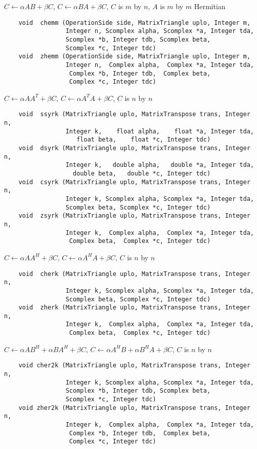 \normalsize
$C \leftarrow \alpha AB + \beta C$, $C \leftarrow \alpha BA + \beta C$,
$C$ is $m$ by $n$, $A$ is $m$ by $m$ Hermitian
\footnotesize
\begin{verbatim}
    void  chemm (OperationSide side, MatrixTriangle uplo, Integer m,
                 Integer n, Scomplex alpha, Scomplex *a, Integer tda,
                 Scomplex *b, Integer tdb, Scomplex beta,
                 Scomplex *c, Integer tdc)
    void  zhemm (OperationSide side, MatrixTriangle uplo, Integer m,
                 Integer n,  Complex alpha,  Complex *a, Integer tda,
                  Complex *b, Integer tdb,  Complex beta,
                  Complex *c, Integer tdc)
\end{verbatim}
\normalsize
$C \leftarrow \alpha A A^T + \beta C$,
$C \leftarrow \alpha A^T A + \beta C$,
$C$ is $n$ by $n$
\footnotesize
\begin{verbatim}
    void  ssyrk (MatrixTriangle uplo, MatrixTranspose trans, Integer n,
                 Integer k,    float alpha,    float *a, Integer tda,
                    float beta,    float *c, Integer tdc)
    void  dsyrk (MatrixTriangle uplo, MatrixTranspose trans, Integer n,
                 Integer k,   double alpha,   double *a, Integer tda,
                   double beta,   double *c, Integer tdc)
    void  csyrk (MatrixTriangle uplo, MatrixTranspose trans, Integer n,
                 Integer k, Scomplex alpha, Scomplex *a, Integer tda,
                 Scomplex beta, Scomplex *c, Integer tdc)
    void  zsyrk (MatrixTriangle uplo, MatrixTranspose trans, Integer n,
                 Integer k,  Complex alpha,  Complex *a, Integer tda,
                  Complex beta,  Complex *c, Integer tdc)
\end{verbatim}
\normalsize
$C \leftarrow \alpha A A^H + \beta C$,
$C \leftarrow \alpha A^H A + \beta C$,
$C$ is $n$ by $n$
\footnotesize
\begin{verbatim}
    void  cherk (MatrixTriangle uplo, MatrixTranspose trans, Integer n,
                 Integer k, Scomplex alpha, Scomplex *a, Integer tda,
                 Scomplex beta, Scomplex *c, Integer tdc)
    void  zherk (MatrixTriangle uplo, MatrixTranspose trans, Integer n,
                 Integer k,  Complex alpha,  Complex *a, Integer tda,
                  Complex beta,  Complex *c, Integer tdc)
\end{verbatim}
\normalsize
$C \leftarrow \alpha A B^H + \alpha B A^H + \beta C$,
$C \leftarrow \alpha A^H B + \alpha B^H A + \beta C$,
$C$ is $n$ by $n$
\footnotesize
\begin{verbatim}
    void cher2k (MatrixTriangle uplo, MatrixTranspose trans, Integer n,
                 Integer k, Scomplex alpha, Scomplex *a, Integer tda,
                 Scomplex *b, Integer tdb, Scomplex beta,
                 Scomplex *c, Integer tdc)
    void zher2k (MatrixTriangle uplo, MatrixTranspose trans, Integer n,
                 Integer k,  Complex alpha,  Complex *a, Integer tda,
                  Complex *b, Integer tdb,  Complex beta,
                  Complex *c, Integer tdc)
\end{verbatim}

